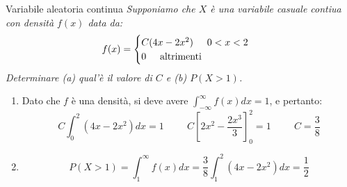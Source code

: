 \begin{Example}{Variabile aleatoria continua}{}
    \textit{Supponiamo che $X$ è una variabile casuale contiua con densità $f(x)$ data da:}
    \begin{equation*}
        f(x)=\begin{cases}
            C(4x-2x^2)\hspace{0.5cm}0<x<2\\0\hspace{0.5cm}\mbox{altrimenti}
        \end{cases}
    \end{equation*}
    \textit{Determinare (a) qual'è il valore di $C$ e (b) $P(X>1)$.}

    \begin{enumerate}[label=(\alph*)]
        \item Dato che $f$ è una densità, si deve avere $\int^\infty_{-\infty}f(x)dx=1$, e pertanto:
        \begin{equation*}
            C\int^2_0(4x-2x^2)dx=1\hspace{1cm}C\left[2x^2-\frac{2x^3}{3}\right]^{2}_{0}=1\hspace{1cm}C=\frac{3}{8}
        \end{equation*}

        \item \begin{equation*}
            P(X>1)=\int^\infty_1f(x)dx=\frac{3}{8}\int^2_1(4x-2x^2)dx=\frac{1}{2}
        \end{equation*}
    \end{enumerate}
\end{Example}

